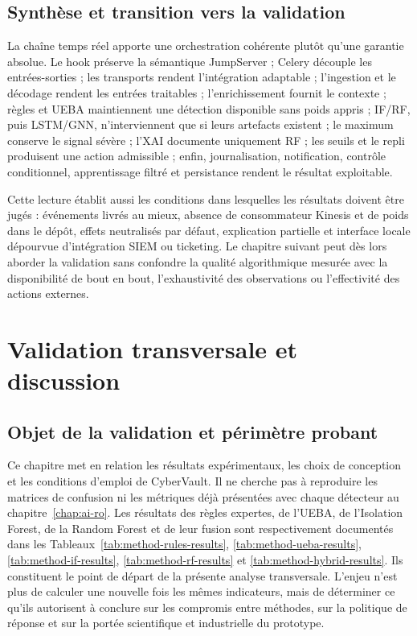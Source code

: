 \documentclass[11pt,a4paper,oneside]{report}
\theoremstyle{definition}
\theoremstyle{plain}
\begin{document}
\section{Synthèse et transition vers la validation}

La chaîne temps réel apporte une orchestration cohérente plutôt qu'une
garantie absolue. Le hook préserve la sémantique JumpServer ; Celery découple
les entrées-sorties ; les transports rendent l'intégration adaptable ;
l'ingestion et le décodage rendent les entrées traitables ; l'enrichissement fournit
le contexte ; règles et UEBA maintiennent une détection disponible sans poids
appris ; IF/RF, puis LSTM/GNN, n'interviennent que si leurs artefacts existent ;
le maximum conserve le signal sévère ; l'XAI documente uniquement RF ; les
seuils et le repli produisent une action admissible ; enfin, journalisation,
notification, contrôle conditionnel, apprentissage filtré et persistance
rendent le résultat exploitable.

Cette lecture établit aussi les conditions dans lesquelles les résultats
doivent être jugés : événements livrés au mieux, absence de consommateur
Kinesis et de poids dans le dépôt, effets neutralisés par défaut, explication
partielle et interface locale dépourvue d'intégration SIEM ou ticketing. Le
chapitre suivant peut dès lors aborder la validation sans confondre la qualité
algorithmique mesurée avec la disponibilité de bout en bout, l'exhaustivité
des observations ou l'effectivité des actions externes.

\chapter{Validation transversale et discussion}
\label{chap:validation}

\section{Objet de la validation et périmètre probant}
\label{sec:validation-scope}

Ce chapitre met en relation les résultats expérimentaux, les choix de conception
et les conditions d'emploi de CyberVault. Il ne cherche pas à reproduire les
matrices de confusion ni les métriques déjà présentées avec chaque détecteur au
chapitre~\ref{chap:ai-ro}. Les résultats des règles expertes, de l'UEBA, de
l'Isolation Forest, de la Random Forest et de leur fusion sont respectivement
documentés dans les
Tableaux~\ref{tab:method-rules-results}, \ref{tab:method-ueba-results},
\ref{tab:method-if-results}, \ref{tab:method-rf-results} et
\ref{tab:method-hybrid-results}. Ils constituent le point de départ de la
présente analyse transversale. L'enjeu n'est plus de calculer une nouvelle fois
les mêmes indicateurs, mais de déterminer ce qu'ils autorisent à conclure sur
les compromis entre méthodes, sur la politique de réponse et sur la portée
scientifique et industrielle du prototype.
\end{document}

